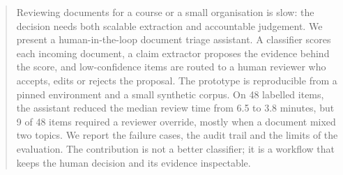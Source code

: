 \begin{abstract}
Reviewing documents for a course or a small organisation is slow: the decision needs
both scalable extraction and accountable judgement. We present a human-in-the-loop
document triage assistant. A classifier scores each incoming document, a claim
extractor proposes the evidence behind the score, and low-confidence items are routed
to a human reviewer who accepts, edits or rejects the proposal. The prototype is
reproducible from a pinned environment and a small synthetic corpus. On 48 labelled
items, the assistant reduced the median review time from 6.5 to 3.8 minutes, but 9 of
48 items required a reviewer override, mostly when a document mixed two topics. We
report the failure cases, the audit trail and the limits of the evaluation. The
contribution is not a better classifier; it is a workflow that keeps the human
decision and its evidence inspectable.
\end{abstract}

\SAIReportKeywords{\SAIReportKeywordText}
